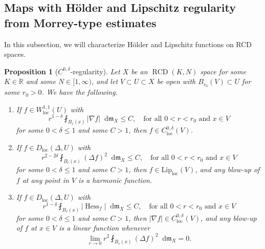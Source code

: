 \documentclass[11pt,reqno]{amsart}
\newtheorem{proposition}[theorem]{Proposition}
\theoremstyle{definition}
\numberwithin{equation}{section}
\newcommand{\di}{\mathop{}\!\mathrm{d}}
\newcommand{\meas}{\mathfrak{m}}
\DeclareMathOperator{\Hess}{Hess}
\DeclareMathOperator{\loc}{loc}
\DeclareMathOperator{\RCD}{RCD}
\begin{document}
\subsection{Maps with H\"older and Lipschitz regularity from Morrey-type estimates}
In this subsection, we will characterize H\"older and Lipschitz functions on RCD spaces.
\begin{proposition}[$C^{0,\delta}$-regularity]\label{propregmap}
    Let $X$ be an $\RCD(K, N)$ space for some $K \in \mathbb{R}$ and some $N \in [1, \infty)$, and let $V\subset U\subset X$ be open  with $B_{r_0}(V) \subset U$ for some $r_0>0$. We have the following.
    \begin{enumerate}
\item If $f \in W^{1,1}_{\loc}(U)$ with
\begin{equation}\label{quantholder}
    r^{1-\delta}\fint_{B_r(x)}|\nabla f|\di \meas_X \le C,\quad \text{for all $0<r<r_0$ and $x \in V$}
\end{equation}
for some $0< \delta \le 1$ and some $C>1$, then $f\in C^{0,\delta}_{\loc}(V)$.
\item If $f \in D_{\loc}(\Delta, U)$ with 
\begin{equation}\label{8s8s8s8sa}
    r^{2-2\delta}\fint_{B_r(x)}(\Delta f)^2\di \meas_X \le C,\quad \text{for all $0<r<r_0$ and $x \in V$}
\end{equation}
for some $0< \delta \le 1$ and some $C>1$, 
then  $f\in \mathrm{Lip}_{\loc}(V)$, and
     any blow-up of $f$ at any point in $V$ is a harmonic function.
\item If $f \in D_{\loc}(\Delta, U)$ with 
\begin{equation}\label{asna89rahweasisarsir}
    r^{1-\delta}\fint_{B_r(x)}|\Hess_f|\di \meas_X \le C,\quad \text{for all $0<r<r_0$ and $x \in V$}
\end{equation}
for some $0< \delta \le 1$ and some $C>1$, then $|\nabla f|\in C_{\loc}^{0,\delta}(V)$,  and any blow-up of $f$ at $x \in V$ is a linear function whenever
\begin{equation}
    \lim_{r\to 0}r^2\fint_{B_r(x)}(\Delta f)^2\di \meas_X=0.
\end{equation}
\end{enumerate}
\end{proposition}
\end{document}

